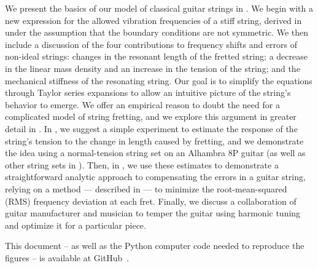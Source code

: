 We present the basics of our model of classical guitar strings in . We begin with a new expression for the allowed vibration frequencies of a stiff string, derived in  under the assumption that the boundary conditions are not symmetric. We then include a discussion of the four contributions to frequency shifts and errors of non-ideal strings: changes in the resonant length of the fretted string; a decrease in the linear mass density and an increase in the tension of the string; and the mechanical stiffness of the resonating string. Our goal is to simplify the equations through Taylor series expansions to allow an intuitive picture of the string's behavior to emerge. We offer an empirical reason to doubt the need for a complicated model of string fretting, and we explore this argument in greater detail in . In , we suggest a simple experiment to estimate the response of the string's tension to the change in length caused by fretting, and we demonstrate the idea using a normal-tension string set on an Alhambra 8P guitar (as well as other string sets in ). Then, in , we use these estimates to demonstrate a straightforward analytic approach to compensating the errors in a guitar string, relying on a method --- described in  --- to minimize the root-mean-squared (RMS) frequency deviation at each fret. Finally, we discuss a collaboration of guitar manufacturer and musician to temper the guitar using harmonic tuning and optimize it for a particular piece.

This document -- as well as the Python computer code needed to reproduce the figures -- is available at GitHub~\cite{ref:github2021rgb}.